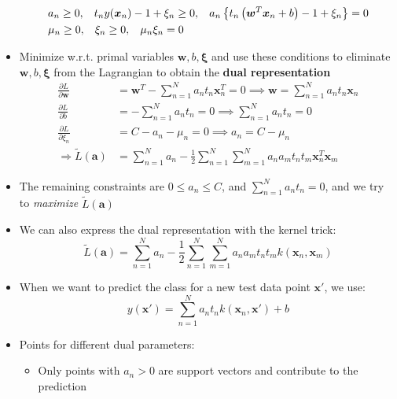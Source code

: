 \begin{itemize}
\begin{equation*}
\begin{split}
			& a_n \geq 0,\text{\hspace{3mm}} t_n y(\bm{x}_n) - 1 + \xi_n \geq 0,\text{\hspace{3mm}} a_n \left\{t_n \left(\bm{w}^T \bm{x}_n + b\right) - 1 + \xi_n \right\} = 0\\
			& \mu_n \geq 0,\text{\hspace{3mm}} \xi_n \geq 0,\text{\hspace{3mm}} \mu_n \xi_n = 0\\
		\end{split}
	\end{equation*}
	\item Minimize w.r.t. primal variables $\bm{w}, b, \bm{\xi}$ and use these conditions to eliminate $\bm{w}, b, \bm{\xi}$ from the Lagrangian to obtain the \textbf{dual representation}
	\begin{equation*}
		\begin{split}
			\frac{\partial L}{\partial \bm{w}} & = \bm{w}^T - \sum\limits_{n=1}^{N} a_n t_n \bm{x}_n^T = 0 \implies \bm{w} = \sum\limits_{n=1}^{N} a_n t_n \bm{x}_n\\
			\frac{\partial L}{\partial b} & = - \sum\limits_{n=1}^{N} a_n t_n = 0 \implies \sum\limits_{n=1}^{N} a_n t_n = 0\\
			\frac{\partial L}{\partial \xi_n} & = C - a_n - \mu_n = 0 \implies a_n  = C - \mu_n\\
			\Rightarrow \tilde{L}(\bm{a}) & = \sum\limits_{n=1}^{N} a_n - \frac{1}{2}  \sum\limits_{n=1}^{N}  \sum\limits_{m=1}^{N} a_n a_m t_n t_m \bm{x}_n^T \bm{x}_m
		\end{split}
	\end{equation*}
	\item The remaining constraints are $0\leq a_n \leq C$, and $\sum\limits_{n=1}^{N} a_n t_n = 0$, and we try to \textit{maximize} $\tilde{L}(\bm{a})$
	\item We can also express the dual representation with the kernel trick:
	$$\tilde{L}(\bm{a}) = \sum\limits_{n=1}^{N} a_n - \frac{1}{2}  \sum\limits_{n=1}^{N}  \sum\limits_{m=1}^{N} a_n a_m t_n t_m k(\bm{x}_n, \bm{x}_m)$$
	\item When we want to predict the class for a new test data point $\bm{x}'$, we use:
	$$y(\bm{x}') = \sum\limits_{n=1}^{N} a_n t_n k(\bm{x}_n, \bm{x}') + b$$
	\item Points for different dual parameters:
	\begin{itemize}
		\item Only points with $a_n > 0$ are support vectors and contribute to the prediction

\end{itemize}
\end{itemize}
